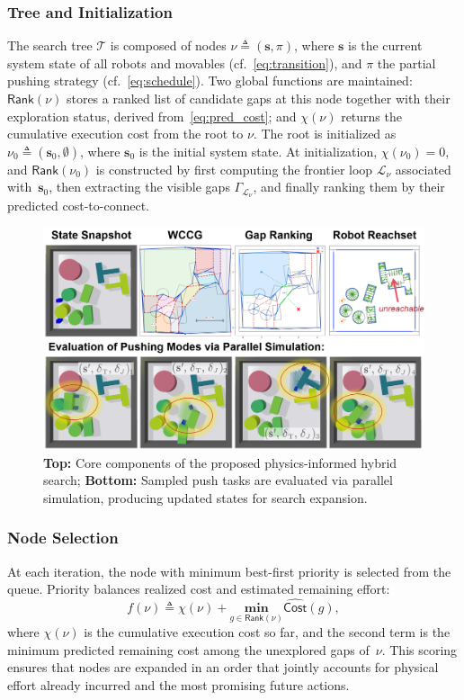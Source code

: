 \subsubsection{Tree and Initialization}
The search tree $\mathcal{T}$ is composed of nodes
$\nu\triangleq(\mathbf{s},\pi)$, where $\mathbf{s}$ is the current system
state of all robots and movables (cf.~\eqref{eq:transition}), and $\pi$ the partial pushing strategy (cf.~\eqref{eq:schedule}). 
Two global functions are
maintained: $\mathsf{Rank}(\nu)$ stores a ranked list of candidate gaps at this
node together with their exploration status, derived from~\eqref{eq:pred_cost};
and $\chi(\nu)$ returns the cumulative execution cost
from the root to $\nu$.
The root is initialized as $\nu_0\triangleq(\mathbf{s}_0,\emptyset)$, where $\mathbf{s}_0$ is the initial system state. 
At initialization, $\chi(\nu_0)=0$, and
$\mathsf{Rank}(\nu_0)$ is constructed by first computing the frontier loop
$\mathcal{L}_\nu$ associated with~$\mathbf{s}_0$, then extracting the visible
gaps $\Gamma_{\mathcal{L}_\nu}$, and finally ranking them by their predicted
cost-to-connect.
\begin{figure}[t!]
  \centering
  \includegraphics[width=0.95\linewidth]{figures/PIHS.png}
  \vspace{-0.15in}
  \caption{
\textbf{Top:} Core components of the proposed physics-informed hybrid search;
\textbf{Bottom:} Sampled push tasks are evaluated via parallel simulation, producing updated states
for search expansion.}
    \label{fig:PIHS}
   \vspace{-4mm}
\end{figure}
\subsubsection{Node Selection}
At each iteration, the node with minimum best-first priority is selected from
the queue. Priority balances realized cost and estimated remaining effort:
\begin{equation}\label{eq:priority}
  f(\nu)\triangleq \chi(\nu)+\underset{g\in \textsf{Rank}(\nu)}{\textbf{min}}
  \widehat{\mathsf{Cost}}(g),
\end{equation}
where $\chi(\nu)$ is the cumulative execution cost so far, and the second term
is the minimum predicted remaining cost among the unexplored gaps of~$\nu$.
This scoring ensures that nodes are expanded in an order that jointly accounts
for physical effort already incurred and the most promising future actions.

